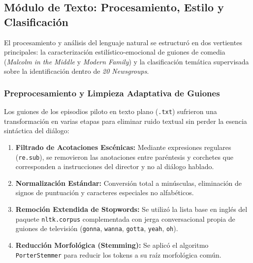 \documentclass[12pt]{article}
\begin{document}
\subsection{Módulo de Texto: Procesamiento, Estilo y Clasificación}

El procesamiento y análisis del lenguaje natural se estructuró en dos vertientes principales: la caracterización estilístico-emocional de guiones de comedia (\textit{Malcolm in the Middle} y \textit{Modern Family}) y la clasificación temática supervisada sobre la identificación dentro de \textit{20 Newsgroups}.

\subsubsection{Preprocesamiento y Limpieza Adaptativa de Guiones}
Los guiones de los episodios piloto en texto plano (\texttt{.txt}) sufrieron una transformación en varias etapas para eliminar ruido textual sin perder la esencia sintáctica del diálogo:
\begin{enumerate}
    \item \textbf{Filtrado de Acotaciones Escénicas:} Mediante expresiones regulares (\texttt{re.sub}), se removieron las anotaciones entre paréntesis y corchetes que corresponden a instrucciones del director y no al diálogo hablado.
    \item \textbf{Normalización Estándar:} Conversión total a minúsculas, eliminación de signos de puntuación y caracteres especiales no alfabéticos.
    \item \textbf{Remoción Extendida de Stopwords:} Se utilizó la lista base en inglés del paquete \texttt{nltk.corpus} complementada con jerga conversacional propia de guiones de televisión (\texttt{gonna}, \texttt{wanna}, \texttt{gotta}, \texttt{yeah}, \texttt{oh}).
    \item \textbf{Reducción Morfológica (Stemming):} Se aplicó el algoritmo \texttt{PorterStemmer} para reducir los tokens a su raíz morfológica común.
\end{enumerate}
\end{document}
